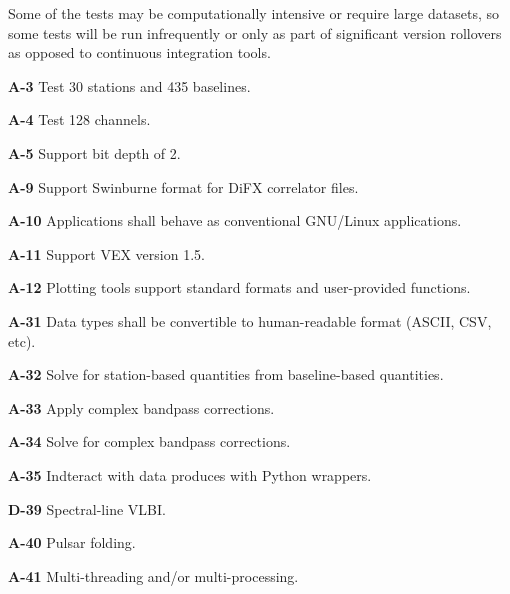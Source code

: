 Some of the tests may be computationally intensive or require large datasets, so some tests will be run infrequently or only as part of significant version rollovers 
as opposed to continuous integration tools.

\begin{description}

\item{\textbf{A-3}} Test 30 stations and 435 baselines.
\item{\textbf{A-4}} Test 128 channels.
\item{\textbf{A-5}} Support bit depth of 2.

\item{\textbf{A-9}} Support Swinburne format for DiFX correlator files.
\item{\textbf{A-10}} Applications shall behave as conventional GNU/Linux applications.
\item{\textbf{A-11}} Support VEX version 1.5.
\item{\textbf{A-12}} Plotting tools support standard formats and user-provided functions.

\item{\textbf{A-31}} Data types shall be convertible to human-readable format (ASCII, CSV, etc).
\item{\textbf{A-32}} Solve for station-based quantities from baseline-based quantities.
\item{\textbf{A-33}} Apply complex bandpass corrections.
\item{\textbf{A-34}} Solve for complex bandpass corrections.
\item{\textbf{A-35}} Indteract with data produces with Python wrappers.

\item{\textbf{D-39}} Spectral-line VLBI.
\item{\textbf{A-40}} Pulsar folding.
\item{\textbf{A-41}} Multi-threading and/or multi-processing.

\end{description}


